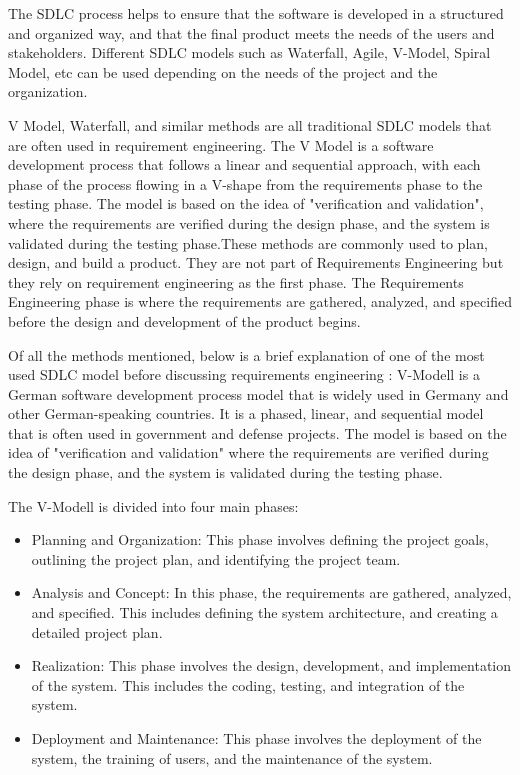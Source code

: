 The SDLC process helps to ensure that the software is developed in a structured and organized way, and that the final product meets the needs of the users and stakeholders. Different SDLC models such as Waterfall, Agile, V-Model, Spiral Model, etc can be used depending on the needs of the project and the organization.

V Model, Waterfall, and similar methods are all traditional SDLC models that are often used in requirement engineering. The V Model is a software development process that follows a linear and sequential approach, with each phase of the process flowing in a V-shape from the requirements phase to the testing phase. The model is based on the idea of "verification and validation", where the requirements are verified during the design phase, and the system is validated during the testing phase.These methods are commonly used to plan, design, and build a product. They are not part of Requirements Engineering but they rely on requirement engineering as the first phase. The Requirements Engineering phase is where the requirements are gathered, analyzed, and specified before the design and development of the product begins.

Of all the methods mentioned, below is a brief explanation of one of the most used SDLC model before discussing requirements engineering :
V-Modell is a German software development process model that is widely used in Germany and other German-speaking countries. It is a phased, linear, and sequential model that is often used in government and defense projects. The model is based on the idea of "verification and validation" where the requirements are verified during the design phase, and the system is validated during the testing phase.

The V-Modell is divided into four main phases:
\begin{itemize}
    \item Planning and Organization: This phase involves defining the project goals, outlining the project plan, and identifying the project team.
    \item Analysis and Concept: In this phase, the requirements are gathered, analyzed, and specified. This includes defining the system architecture, and creating a detailed project plan.
    \item Realization: This phase involves the design, development, and implementation of the system. This includes the coding, testing, and integration of the system.
    \item Deployment and Maintenance: This phase involves the deployment of the system, the training of users, and the maintenance of the system.
\end{itemize}

